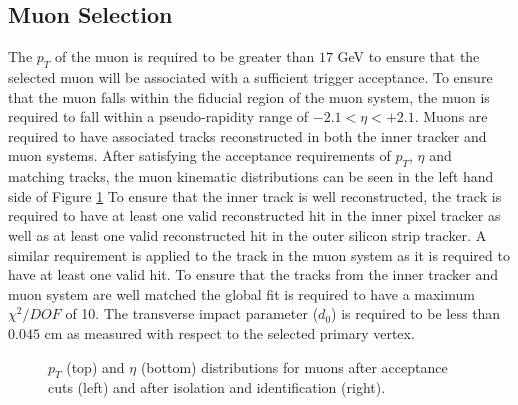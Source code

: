\subsection{Muon Selection}
\label{sec:muonselection}
The $p_{T}$ of the muon is required to be greater than $17$ GeV to ensure that the selected muon will be associated with a sufficient trigger acceptance.
To ensure that the muon falls within the fiducial region of the muon system, the muon is required to fall within a pseudo-rapidity range of $-2.1 < \eta < +2.1$.
Muons are required to have associated tracks reconstructed in both the inner tracker and muon systems. 
After satisfying the acceptance requirements of $p_{T}$, $\eta$ and matching tracks, the muon kinematic distributions can be seen in the left hand side of Figure \ref{fig:muoncuts}
To ensure that the inner track is well reconstructed, the track is required to have at least one valid reconstructed hit in the inner pixel tracker as well as at least one valid reconstructed hit in the outer silicon strip tracker. 
A similar requirement is applied to the track in the muon system as it is required to have at least one valid hit. 
To ensure that the tracks from the inner tracker and muon system are well matched the global fit is required to have a maximum $\chi^{2}/DOF$ of 10. 
The transverse impact parameter ($d_{0}$) is required to be less than $0.045$ cm as measured with respect to the selected primary vertex.
\begin{figure}[ht]
\centering
{}

\caption{$p_{T}$ (top) and $\eta$ (bottom) distributions for muons after acceptance cuts (left) and after isolation and identification (right).}
\label{fig:muoncuts}
\end{figure}

